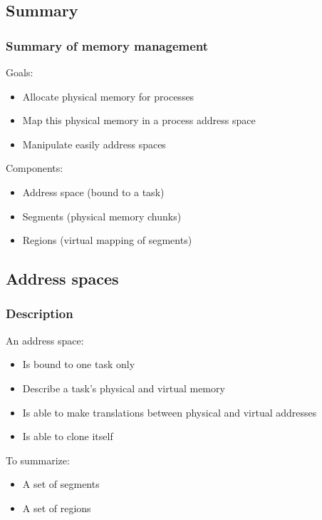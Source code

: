 %
%

\subsection{Summary}


\begin{frame}
  \frametitle{Summary of memory management}

  Goals:

  \nl

  \begin{itemize}[<+->]
  \item Allocate physical memory for processes
  \item Map this physical memory in a process address space
  \item Manipulate easily address spaces
  \end{itemize}

  \nl

  Components:

  \nl

  \begin{itemize}[<+->]
  \item Address space (bound to a task)
  \item Segments (physical memory chunks)
  \item Regions (virtual mapping of segments)
  \end{itemize}

\end{frame}

%
%

\subsection{Address spaces}


\begin{frame}
  \frametitle{Description}

  An address space:

  \nl

  \begin{itemize}[<+->]
  \item Is bound to one task only
  \item Describe a task's physical and virtual memory
  \item Is able to make translations between physical and virtual addresses
  \item Is able to clone itself
  \end{itemize}

  \nl

  To summarize:

  \nl

  \begin{itemize}[<+->]
  \item A set of segments
  \item A set of regions
  \end{itemize}

\end{frame}

